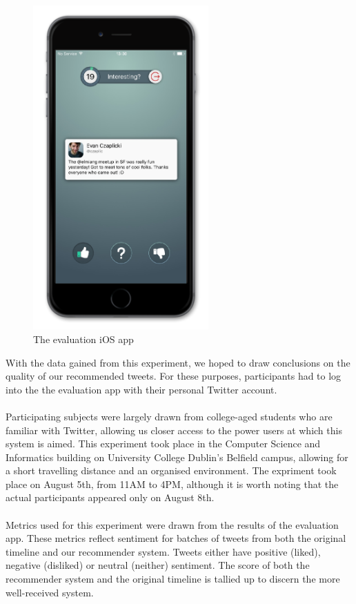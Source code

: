 \documentclass{article}
\begin{document}
\begin{figure}[H]
    \includegraphics[width=0.6\textwidth, center]{iphone_11_eval}
    \caption{The evaluation iOS app}
\end{figure}

\noindent With the data gained from this experiment, we hoped to draw conclusions on the quality of our recommended tweets. For these purposes, participants had to log into the the evaluation app with their personal Twitter account.
\\\\
Participating subjects were largely drawn from college-aged students who are familiar with Twitter, allowing us closer access to the power users at which this system is aimed. This experiment took place in the Computer Science and Informatics building on University College Dublin's Belfield campus, allowing for a short travelling distance and an organised environment. The expriment took place on August 5th, from 11AM to 4PM, although it is worth noting that the actual participants appeared only on August 8th.
\\\\
Metrics used for this experiment were drawn from the results of the evaluation app. These metrics reflect sentiment for batches of tweets from both the original timeline and our recommender system. Tweets either have positive (liked), negative (disliked) or neutral (neither) sentiment. The score of both the recommender system and the original timeline is tallied up to discern the more well-received system.
\end{document}
